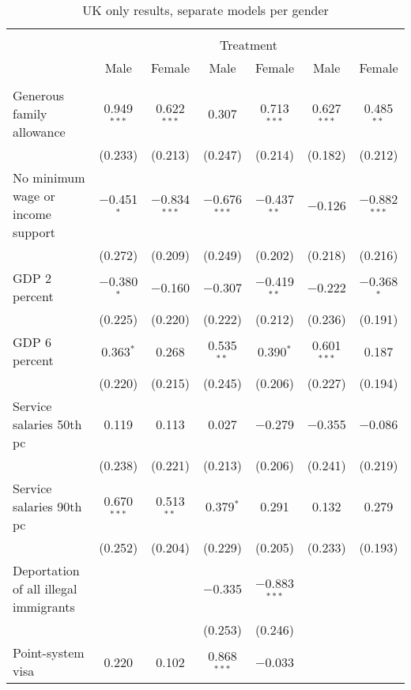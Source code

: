 
\begin{sidewaystable}[!htbp] \centering 
  \caption{UK only results, separate models per gender} 
  \label{tab:uk_gender} 
\begin{tabular}{@{\extracolsep{5pt}}lcccccc} 
\\[-1.8ex]\hline 
\hline \\[-1.8ex] 
 & \multicolumn{6}{c}{Treatment} \\ 
\cline{2-7} 
 & Male & Female & Male & Female & Male & Female \\ 
\hline \\[-1.8ex] 
 Generous family allowance & 0.949$^{***}$ & 0.622$^{***}$ & 0.307 & 0.713$^{***}$ & 0.627$^{***}$ & 0.485$^{**}$ \\ 
  & (0.233) & (0.213) & (0.247) & (0.214) & (0.182) & (0.212) \\ 
  No minimum wage or income support & $-$0.451$^{*}$ & $-$0.834$^{***}$ & $-$0.676$^{***}$ & $-$0.437$^{**}$ & $-$0.126 & $-$0.882$^{***}$ \\ 
  & (0.272) & (0.209) & (0.249) & (0.202) & (0.218) & (0.216) \\ 
  GDP 2 percent & $-$0.380$^{*}$ & $-$0.160 & $-$0.307 & $-$0.419$^{**}$ & $-$0.222 & $-$0.368$^{*}$ \\ 
  & (0.225) & (0.220) & (0.222) & (0.212) & (0.236) & (0.191) \\ 
  GDP 6 percent & 0.363$^{*}$ & 0.268 & 0.535$^{**}$ & 0.390$^{*}$ & 0.601$^{***}$ & 0.187 \\ 
  & (0.220) & (0.215) & (0.245) & (0.206) & (0.227) & (0.194) \\ 
  Service salaries 50th pc & 0.119 & 0.113 & 0.027 & $-$0.279 & $-$0.355 & $-$0.086 \\ 
  & (0.238) & (0.221) & (0.213) & (0.206) & (0.241) & (0.219) \\ 
  Service salaries 90th pc & 0.670$^{***}$ & 0.513$^{**}$ & 0.379$^{*}$ & 0.291 & 0.132 & 0.279 \\ 
  & (0.252) & (0.204) & (0.229) & (0.205) & (0.233) & (0.193) \\ 
  Deportation of all illegal immigrants &  &  & $-$0.335 & $-$0.883$^{***}$ &  &  \\ 
  &  &  & (0.253) & (0.246) &  &  \\ 
  Point-system visa & 0.220 & 0.102 & 0.868$^{***}$ & $-$0.033 &  &  \\ 

\end{tabular}
\end{sidewaystable}
